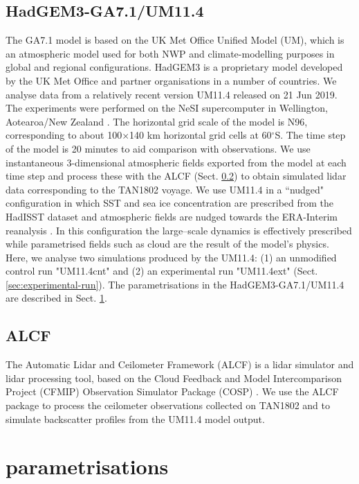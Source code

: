 \subsection{HadGEM3-GA7.1/UM11.4}

The GA7.1 model is based on the UK Met Office Unified Model (UM), which is an
atmospheric model used for both NWP and climate-modelling purposes in global and regional
configurations. HadGEM3 is a proprietary model developed by the UK Met Office
and partner organisations in a number of countries. We analyse data from a relatively
recent version UM11.4 released on 21 Jun 2019. The experiments were performed on the NeSI
supercomputer in Wellington, Aotearoa/New Zealand \citep{williams2016}.
The horizontal grid scale of the model is N96,
corresponding to about 100$\times$140 km horizontal grid cells at
60$^\circ$S. The time step of the model is 20 minutes to aid comparison with observations. 
We use instantaneous 3-dimensional atmospheric fields exported from the model at each time
step and process these with the ALCF (Sect. \ref{sec:alcf}) to obtain simulated
lidar data corresponding to the TAN1802 voyage. We use UM11.4 in a ``nudged"
configuration in which SST and sea ice concentration are prescribed from
the HadISST dataset \citep{rayner2003} and atmospheric fields are nudged towards the
ERA-Interim reanalysis \citep{dee2011}. In this configuration the large--scale
dynamics is effectively prescribed while parametrised fields
such as cloud are the result of the model's physics. Here, we analyse
two simulations produced by the UM11.4: (1) an unmodified control run "UM11.4cnt"
and (2) an experimental run "UM11.4ext" (Sect. \ref{sec:experimental-run}).
The parametrisations in the HadGEM3-GA7.1/UM11.4 are described in Sect. \ref{sec:parametrisations}.

\subsection{ALCF}
\label{sec:alcf}

The Automatic Lidar and Ceilometer Framework (ALCF) \citep{kuma2020b} is a lidar
simulator and lidar processing tool, based on the Cloud
Feedback and Model Intercomparison Project (CFMIP) Observation Simulator Package
(COSP) \citep{bodas-salcedo2011}. We use the ALCF package to process the ceilometer
observations collected on TAN1802 and to simulate backscatter profiles from
the UM11.4 model output.

\section{parametrisations}
\label{sec:parametrisations}

